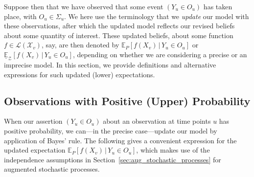 \documentclass[twoside,11pt]{article}
\newcommand{\states}{\mathcal{X}}
\newcommand{\gambles}{\mathcal{L}}
\begin{document}
Suppose then that we have observed that some event $(Y_u\in O_u)$ has taken place, with $O_u\in\Sigma_u$. We here use the terminology that we \emph{update} our model with these observations, after which the updated model reflects our revised beliefs about some quantity of interest. These updated beliefs, about some function $f\in\gambles(\states_v)$, say, are then denoted by
$\mathbb{E}_P[f(X_v)\,\vert\,Y_u\in O_u]$ %
or $\underline{\mathbb{E}}_\mathcal{Z}[f(X_v)\,\vert\,Y_u\in O_u]$, 
depending on whether we are considering a precise or an imprecise model. In this section, we provide definitions and alternative expressions for such updated (lower) expectations.



\subsection{Observations with Positive (Upper) Probability}\label{subsec:pos_prob}

When our assertion $(Y_u\in O_u)$ about an observation at time points $u$ has positive probability, we can---in the precise case---update our model by application of Bayes' rule. The following gives a convenient expression for the updated expectation $\mathbb{E}_P[f(X_v)\,\vert\,Y_u\in O_u]$, which makes use of the independence assumptions in Section~\ref{sec:aug_stochastic_processes} for augmented stochastic processes.
\end{document}

